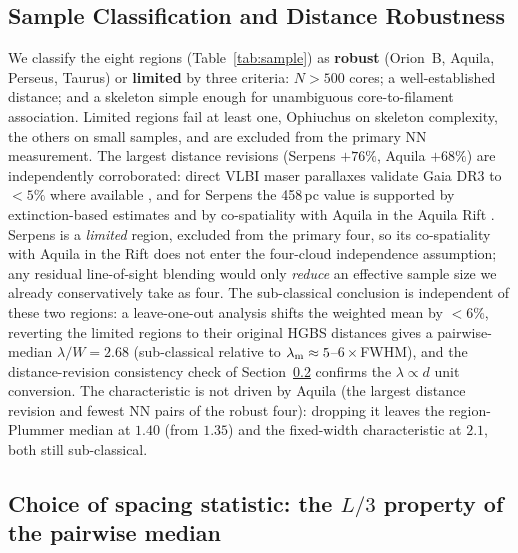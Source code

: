 \documentclass[usenatbib,twoside,twocolumn]{mnras}
\begin{document}
\subsection{Sample Classification and Distance Robustness}
\label{sec:distance_uncertainties}

We classify the eight regions (Table~\ref{tab:sample}) as \textbf{robust} (Orion~B, Aquila, Perseus, Taurus) or \textbf{limited} by three criteria: $N>500$ cores; a well-established distance; and a skeleton simple enough for unambiguous core-to-filament association. Limited regions fail at least one, Ophiuchus on skeleton complexity, the others on small samples, and are excluded from the primary NN measurement. The largest distance revisions (Serpens $+76\%$, Aquila $+68\%$) are independently corroborated: direct VLBI maser parallaxes validate Gaia DR3 to $<5\%$ where available \citep{Kounkel2018,Xu2021,OrtizLeon2018,OrtizLeon2017}, and for Serpens the 458\,pc value is supported by extinction-based estimates \citep[$440$--$460$\,pc;][]{Yan2022,Green2024} and by co-spatiality with Aquila in the Aquila Rift \citep{Zucker2020}. Serpens is a \emph{limited} region, excluded from the primary four, so its co-spatiality with Aquila in the Rift does not enter the four-cloud independence assumption; any residual line-of-sight blending would only \emph{reduce} an effective sample size we already conservatively take as four. The sub-classical conclusion is independent of these two regions: a leave-one-out analysis shifts the weighted mean by $<6\%$, reverting the limited regions to their original HGBS distances gives a pairwise-median $\lambda/W=2.68$ (sub-classical relative to $\lambda_{\rm m}\approx5$--$6\times$FWHM), and the distance-revision consistency check of Section~\ref{sec:statistics} confirms the $\lambda\propto d$ unit conversion. The characteristic is not driven by Aquila (the largest distance revision and fewest NN pairs of the robust four): dropping it leaves the region-Plummer median at $1.40$ (from $1.35$) and the fixed-width characteristic at $2.1$, both still sub-classical.


\subsection{Choice of spacing statistic: the $L/3$ property of the pairwise median}
\label{sec:statistics}
\end{document}
